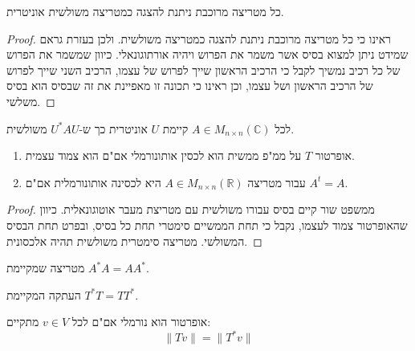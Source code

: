 \documentclass{tstextbook}
\begin{document}
\begin{theorem}[שור]
כל מטריצה מרוכבת ניתנת להצגה כמטריצה משולשית אוניטרית.

\end{theorem}
\begin{proof}
ראינו כי כל מטריצה מרוכבת ניתנת להצגה כמטריצה משולשית. ולכן בעזרת גראם שמידט ניתן למצוא בסיס אשר משמר את הפרוש ויהיה אורתוגונאלי. כיוון שמשמר את הפרוש של כל רכיב נמשיך לקבל כי הרכיב הראשון שייך לפרוש של עצמו, הרכיב השני שייך לפרוש של הרכיב הראשון ושל עצמו, וכן ראינו כי תכונה זו מאפיינת את זה שבסיס הוא בסיס משלשי.

\end{proof}
\begin{corollary}
לכל \(A \in M_{n \times n}\left( \mathbb{C} \right)\)  קיימת \(U\) אוניטרית כך ש-\(U^{*}AU\) משולשית.

\end{corollary}
\begin{theorem}
  \begin{enumerate}
    \item אופרטור \(T\) על ממ"פ ממשית הוא לכסין אותונורמלי אם"ם הוא צמוד עצמית. 


    \item עבור מטריצה \(A\in M_{n\times n}\left( \mathbb R \right)\) היא לכסינה אותונורמלית אם"ם \(A^t = A\). 


  \end{enumerate}
\end{theorem}
\begin{proof}
ממשפט שור קיים בסיס עבורו משולשית עם מטריצת מעבר אוטוגונאלית. כיוון שהאופרטור צמוד לעצמו, נקבל כי תחת הממשיים סימטרי תחת כל בסיס, ובפרט תחת הבסיס המשולשי. מטריצה סימטרית משולשית תהיה אלכסונית.

\end{proof}
\begin{definition}
מטריצה שמקיימת \(A^* A = A A^*\).

\end{definition}
\begin{definition}
העתקה המקיימת \(T^*T = TT^*\).

\end{definition}
\begin{proposition}
אופרטור הוא נורמלי אם"ם לכל \(v \in V\) מתקיים:
$$\lVert Tv \rVert =\lVert T^{*}v \rVert $$

\end{proposition}
\end{document}
